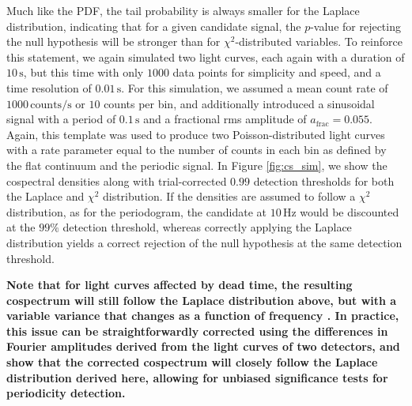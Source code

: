 \documentclass[12pt]{emulateapj}
\begin{document}
\noindent Much like the PDF, the tail probability is always smaller for the Laplace distribution, indicating that for a given candidate signal, the $p$-value for rejecting the null hypothesis will be stronger than for $\chi^2$-distributed variables. To reinforce this statement, we again simulated two light curves, each again with a duration of $10\,\mathrm{s}$, but this time with only $1000$ data points for simplicity and speed, and a time resolution of $0.01\,\mathrm{s}$. For this simulation, we assumed a mean count rate of $1000\,\mathrm{counts/s}$ or $10$ counts per bin, and additionally introduced a sinusoidal signal with a period of $0.1\,\mathrm{s}$ and a fractional rms amplitude of $a_\mathrm{frac} = 0.055$. Again, this template was used to produce two Poisson-distributed light curves with a rate parameter equal to the number of counts in each bin as defined by the flat continuum and the periodic signal. In Figure \ref{fig:cs_sim}, we show the cospectral densities along with trial-corrected $0.99$ detection thresholds for both the Laplace and $\chi^2$ distribution. If the densities are assumed to follow a $\chi^2$ distribution, as for the periodogram, the candidate at $10 \,\mathrm{Hz}$ would be discounted at the $99\%$ detection threshold, whereas correctly applying the Laplace distribution yields a correct rejection of the null hypothesis at the same detection threshold.

\textbf{Note that for light curves affected by dead time, the resulting cospectrum will still follow the Laplace distribution above, but with a variable variance that changes as a function of frequency \citep{Bachetti+15}. In practice, this issue can be straightforwardly corrected using the differences in Fourier amplitudes derived from the light curves of two detectors, and \citet{bachetti2017} show that the corrected cospectrum will closely follow the Laplace distribution derived here, allowing for unbiased significance tests for periodicity detection.}
\end{document}
